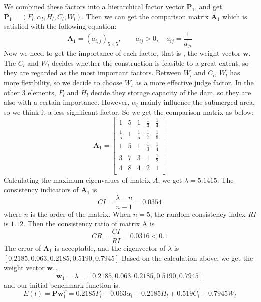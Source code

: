 \documentclass{mcmthesis}
\begin{document}
We combined these factors into a hierarchical factor vector $\textbf{P}_1$, and get $\textbf{P}_1 = (F_{l}, \alpha_{l}, H_{l}, C_{l}, W_{l})$. Then we can get the comparison matrix $\textbf{A}_1$ which is satisfied with the following equation:
\begin{equation}
\textbf{A}_1 = (a_{i,j})_{5\times5},\qquad a_{ij} > 0, \quad a_{ij} = \frac{1}{a_{ji}}
\end{equation}
Now we need to get the importance of each factor, that is , the weight vector $\textbf{w}$. The $C_{l}$ and $W_{l}$ decides whether the construction is feasible to a great extent, so they are regarded as the most important factors. Between $W_{l}$ and $C_{l}$, $W_{l}$ has more flexibility, so we decide to choose $W_{l}$ as a more effective judge factor. In the other 3 elements, $F_{l}$ and $H_{l}$ decide they storage capacity of the dam, so they are also with a certain importance. However, $\alpha_{l}$ mainly influence the submerged area, so we think it a less significant factor. So we get the comparison matrix as below:
\[\textbf{A}_1 = 
\left[
\begin{matrix}
1 & 5 & 1 & \frac{1}{3} & \frac{1}{4} \\
\frac{1}{5}  & 1 & \frac{1}{5} & \frac{1}{7} & \frac{1}{8} \\ 
1 & 5 & 1 & \frac{1}{3} & \frac{1}{4} \\
3 & 7 & 3 & 1 & \frac{1}{2} \\
4 & 8 & 4 & 2 & 1 \\
\end{matrix}
\right]
\]
Calculating the maximum eigenvalues of matrix $A$, we get $\lambda = 5.1415$. The consistency indicators of $\textbf{A}_1$ is \[\mathit{CI} = \frac{\lambda - n}{n - 1} = 0.0354\]
where $n$ is the order of the matrix. When $n = 5$, the random consistency index \textit{RI} is $1.12$. Then the consistency ratio of matrix A is \[\mathit{CR} = \frac{\mathit{CI}}{\mathit{RI}} = 0.0316 < 0.1 \]
The error of $\textbf{A}_1$ is acceptable, and the eigenvector of $\lambda$ is $\left[0.2185, 0.063, 0.2185, 0.5190, 0.7945\right]$
Based on the calculation above, we get the weight vector $\textbf{w}_{1}$.
\begin{equation}
\textbf{w}_{1} = \lambda = \left[0.2185, 0.063, 0.2185, 0.5190, 0.7945\right]
\end{equation}
and our initial benchmark function is:
\begin{equation}
E(l) = \textbf{P}\textbf{w}_{1}^{T} = 0.2185F_l + 0.063{\alpha}_{l} + 0.2185H_l + 0.519C_l + 0.7945W_l
\end{equation}
\end{document}
